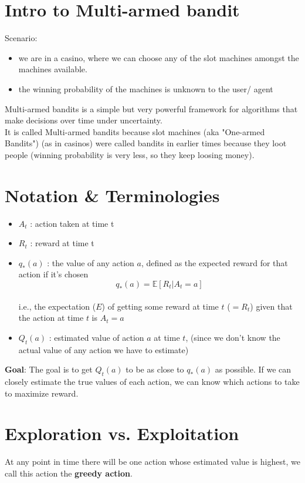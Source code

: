 \section{Intro to Multi-armed bandit}
Scenario: 
\begin{itemize}
    \item we are in a casino, where we can choose any of the slot machines amongst the machines available.
    \item the winning probability of the machines is unknown to the user/ agent
\end{itemize}
Multi-armed bandits is a simple but very powerful framework for algorithms that make decisions over time under uncertainty.\\
It is called Multi-armed bandits because slot machines (aka "One-armed Bandits") (as in casinos) were called bandits in earlier times because they loot people (winning probability is very less, so they keep loosing money).

\section{Notation \& Terminologies \cite{medium-numsmt2-rl-ch2-part-1}}
\begin{itemize}
    \item $A_t$ : action taken at time t
    \item $R_t$ : reward at time t
    \item $q_*(a)$ : the value of any action $a$, defined as the expected reward for that action if it’s chosen \[
        q_*(a) = \mathbb{E}[R_t | A_t = a]
    \]\\[-0.5cm]
    i.e., the expectation ($E$) of getting some reward at time $t$ ($=R_t$) given that the action at time $t$ is $A_t = a$
    \item $Q_t(a)$ : estimated value of action $a$ at time $t$, (since we don’t know the actual value of any action we have to estimate)
\end{itemize}

\vspace{0.2cm}
\noindent\textbf{Goal}: The goal is to get $Q_t(a)$ to be as close to $q_*(a)$ as possible. If we can closely estimate the true values of each action, we can know which actions to take to maximize reward.

\section{Exploration vs. Exploitation \cite{medium-numsmt2-rl-ch2-part-1}}\label{Exploration vs. Exploitation}
At any point in time there will be one action whose estimated value is highest, we call this action the \textbf{greedy action}.

